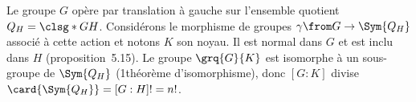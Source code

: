 Le groupe $G$ opère par translation à gauche sur l'ensemble quotient $Q_H = \smash{\clsg*{G}{H}}$.
Considérons le morphisme de groupes $\gamma\from G\to\Sym{Q_H}$ associé à cette action et notons $K$ son noyau. 
Il est normal dans $G$ et est inclu dans $H$ (proposition~5.15).
Le groupe $\grq{G}{K}$ est isomorphe à un sous-groupe de $\Sym{Q_H}$ (1\ier théorème d'isomorphisme), donc $[G:K]$ divise $\card{\Sym{Q_H}} = [G:H]! = n!$.
